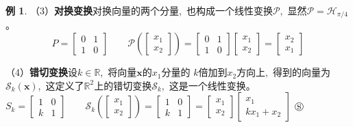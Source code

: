 \documentclass[10pt, a4paper, oneside, fontset=none]{ctexart}
\theoremstyle{plain}
\theoremstyle{definition}
\newtheorem{example}[theorem]{例}
\newcommand{\com}{,\,\,\,\:}
\newcommand{\R}{\mathbb{R}}
\newcommand{\tboba}[1]{\textbf{\kai\color{bali!75!black}#1}}
\begin{document}
\begin{pf}
\begin{example}
    （3）\tboba{对换变换}\quad 对换向量的两个分量\com 也构成一个线性变换$\mathscr{P}$\com 显然$\mathscr{P}=\mathscr{H}_{\pi/4}$。
    $$P=\begin{bmatrix}
        0&1\\1&0
    \end{bmatrix}
    \quad\quad \mathscr{P}\left(\begin{bmatrix}
        x_1\\x_2
    \end{bmatrix}\right)=\begin{bmatrix}
        0&1\\1&0
    \end{bmatrix}\begin{bmatrix}
        x_1\\x_2
    \end{bmatrix}=\begin{bmatrix}
        x_2\\x_1
    \end{bmatrix}$$

    （4）\tboba{错切变换}\quad 设$k\in\R$\com 将向量$\boldsymbol{x}$的$x_1$分量的 $k$倍加到$x_2$方向上\com 得到的向量为$\mathscr{S}_k(\boldsymbol{x})$\com 这定义了$\R^2$上的错切变换$\mathscr{S}_k$\com 这是一个线性变换。
    \vskip 10pt
    \quad \hfill $
        S_k=\begin{bmatrix}
            1&0\\k&1
        \end{bmatrix}
        \quad\quad \mathscr{S}_k\left(\begin{bmatrix}
            x_1\\x_2
        \end{bmatrix}\right)=\begin{bmatrix}
            1&0\\k&1
        \end{bmatrix}=\begin{bmatrix}
            x_1\\x_2
        \end{bmatrix}\begin{bmatrix}
            x_1 \\ kx_1+x_2
        \end{bmatrix}
    $ \hfill $\circledS$
\end{example}
\end{pf}
\end{document}

